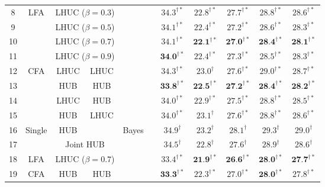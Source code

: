\documentclass{INTERSPEECH2023}
\newcommand{\xmark}{\ding{55}}
\begin{document}
\begin{table}[htbp]
{\begin{tabular}{c|c|cc|c|c|cc|ccc}
8 & \multirow{4}{*}{LFA} & \multicolumn{2}{c|}{LHUC ($\beta=0.3$)} & & & $34.3^{\dagger\ast}$ & $22.8^{\dagger\ast}$ & $27.7^{\dagger\ast}$ & $28.8^{\dagger\ast}$ & $28.6^{\dagger\ast}$ \\
9 &  & \multicolumn{2}{c|}{LHUC ($\beta=0.5$)} & & & $34.1^{\dagger\ast}$ & $22.4^{\dagger\ast}$ & $27.2^{\dagger\ast}$ & $28.6^{\dagger\ast}$ & $28.3^{\dagger\ast}$  \\ 
10 &  & \multicolumn{2}{c|}{LHUC ($\beta=0.7$)} & & & $34.1^{\dagger\ast}$ & $\textbf{22.1}^{\dagger\ast}$ & $\textbf{27.0}^{\dagger\ast}$ & $\textbf{28.4}^{\dagger\ast}$ & $\textbf{28.1}^{\dagger\ast}$ \\ %
11 &  & \multicolumn{2}{c|}{LHUC ($\beta=0.9$)} & & & $\textbf{34.0}^{\dagger\ast}$ & $22.4^{\dagger\ast}$ & $27.3^{\dagger\ast}$ & $28.5^{\dagger\ast}$ & $28.3^{\dagger\ast}$ \\ \cline{1-4} \cline{7-11} 

12 & \multirow{4}{*}{CFA} & LHUC & LHUC & & & $34.3^{\dagger\ast}$ & $23.0^{\dagger}$ & $27.6^{\dagger\ast}$ & $29.0^{\dagger\ast}$ & $28.7^{\dagger\ast}$ \\ 
13 &  & HUB & HUB & & & $\textbf{33.8}^{\dagger\ast}$ & $\textbf{22.5}^{\dagger\ast}$ & $\textbf{27.2}^{\dagger\ast}$ & $\textbf{28.4}^{\dagger\ast}$ & $\textbf{28.2}^{\dagger\ast}$  \\  
14 &  & LHUC & HUB & & & $34.0^{\dagger\ast}$ & $22.9^{\dagger\ast}$ & $27.5^{\dagger\ast}$ & $28.8^{\dagger\ast}$ & $28.5^{\dagger\ast}$ \\ 
15 &  & HUB & LHUC & & & $34.0^{\dagger\ast}$ & $23.1^{\dagger}$ & $27.6^{\dagger\ast}$ & $28.8^{\dagger\ast}$ & $28.6^{\dagger\ast}$ \\ \hline

16 & \multirow{2}{*}{Single} & HUB & \xmark &\multirow{4}{*}{Bayes} & \multirow{4}{*}{\xmark}& $34.9^{\dagger}$ & $23.2^{\dagger}$ & $28.1^{\dagger}$ & $29.3^{\dagger}$ & $29.0^{\dagger}$\\ 
17 &  & \multicolumn{2}{c|}{Joint HUB} & & & $34.5^{\dagger}$ & $22.8^{\dagger}$ & $27.6^{\dagger}$ & $28.9^{\dagger}$ & $28.6^{\dagger}$ \\ \cline{2-2}
18 & LFA & \multicolumn{2}{c|}{LHUC ($\beta=0.7$)} & & & $33.4^{\dagger\ast}$ & $\textbf{21.9}^{\dagger\ast}$ & $\textbf{26.6}^{\dagger\ast}$ & $\textbf{28.0}^{\dagger\ast}$ & $\textbf{27.7}^{\dagger\ast}$ \\ 
19 & CFA & HUB & HUB & & & $\textbf{33.3}^{\dagger\ast}$ & $22.3^{\dagger\ast}$ & $27.0^{\dagger\ast}$ & $\textbf{28.0}^{\dagger\ast}$ & $27.8^{\dagger\ast}$ \\  \hline


\end{tabular}}
\end{table}
\end{document}
